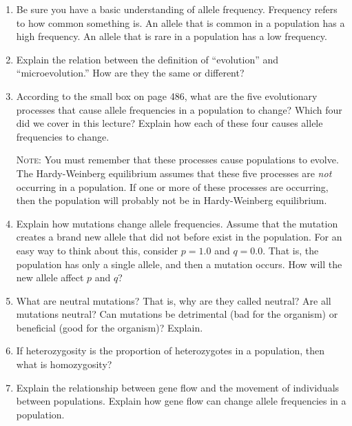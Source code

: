 \documentclass[letterpaper]{tufte-handout}
\newcommand\lecturefile{163_lecture04_fullsize}
\begin{document}
\begin{enumerate}

	\item Be sure you have a basic understanding of allele frequency.%
	Frequency refers to how common something is. An allele that is common in a population has a high frequency. An allele that is rare in a population has a low frequency.
	
	\item Explain the relation between the definition of ``evolution'' 
	and “microevolution.” How are they the same or different? 

	\item According to the small box on page 486, what are the 
	five evolutionary processes that cause allele frequencies in 
	a population to change? Which four did we cover in this lecture? 
	Explain how each of these four causes allele frequencies to change.
	

	\textsc{Note:} You must remember that these processes cause 
	populations to evolve. The Hardy-Weinberg equilibrium assumes 
	that these five processes are \emph{not} occurring in a population. 
	If one or more of these processes are occurring, then the 
	population will probably not be in Hardy-Weinberg equilibrium.
	
	\item Explain how mutations change allele frequencies. Assume that
	the mutation creates a brand new allele that did not before exist
	in the population. For an easy way to think about this, consider 
	$p = 1.0$ and $q = 0.0$. That is, the population has only a single
	allele, and then a mutation occurs. How will the new allele affect 
	$p$ and $q$?
	
	\item What are neutral mutations? That is, why are they called 
	neutral? Are all mutations neutral? Can mutations be detrimental
	(bad for the organism) or beneficial (good for the organism)? 
	Explain.
	
	\item If heterozygosity is the proportion of heterozygotes in a 
	population, then what is homozygosity?	
	
	\item Explain the relationship between gene flow and the movement
	of individuals between populations. Explain how gene flow can change
	allele frequencies in a population. 
	

\end{enumerate}
\end{document}
